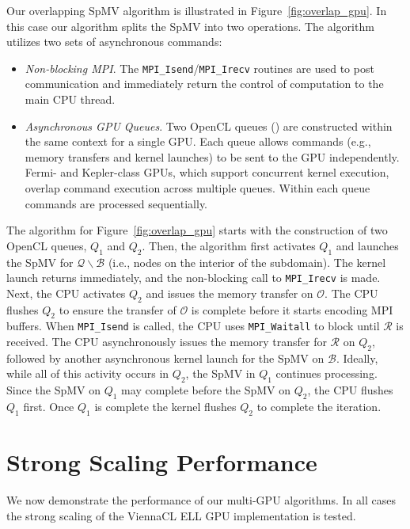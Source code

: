Our overlapping SpMV algorithm is illustrated in Figure~\ref{fig:overlap_gpu}. In this case our algorithm splits the SpMV into two operations. The algorithm utilizes two sets of asynchronous commands: 
\begin{itemize} 
\item \emph{Non-blocking MPI}. The \texttt{MPI\_Isend}/\texttt{MPI\_Irecv} routines are used to post communication and immediately return the control of computation to the main CPU thread. 
\item \emph{Asynchronous GPU Queues}. Two OpenCL queues (\cite{Gerstmann2009}) are constructed within the same context for a single GPU. Each queue allows commands (e.g., memory transfers and kernel launches) to be sent to the GPU independently. Fermi- and Kepler-class GPUs, which support concurrent kernel execution, overlap command execution across multiple queues. Within each queue commands are processed sequentially.
\end{itemize}

The algorithm for Figure~\ref{fig:overlap_gpu} starts with the construction of two OpenCL queues, $Q_1$ and $Q_2$. Then, the algorithm first activates $Q_1$ and launches the SpMV for $\mathcal{Q} \backslash \mathcal{B}$ (i.e., nodes on the interior of the subdomain). The kernel launch returns immediately, and the non-blocking call to \texttt{MPI\_Irecv} is made. Next, the CPU activates $Q_2$ and issues the memory transfer on $\mathcal{O}$. The CPU flushes $Q_2$ to ensure the transfer of $\mathcal{O}$ is complete before it starts encoding MPI buffers. When \texttt{MPI\_Isend} is called, the CPU uses \texttt{MPI\_Waitall} to block until $\mathcal{R}$ is received. The CPU asynchronously issues the memory transfer for $\mathcal{R}$ on $Q_2$, followed by another asynchronous kernel launch for the SpMV on $\mathcal{B}$. Ideally, while all of this activity occurs in $Q_2$, the SpMV in $Q_1$ continues processing. Since the SpMV on $Q_1$ may complete before the SpMV on $Q_2$, the CPU flushes $Q_1$ first. Once $Q_1$ is complete the kernel flushes $Q_2$ to complete the iteration. 

\section{Strong Scaling Performance}

We now demonstrate the performance of our multi-GPU algorithms. In all cases the strong scaling of the ViennaCL ELL GPU implementation is tested.  

